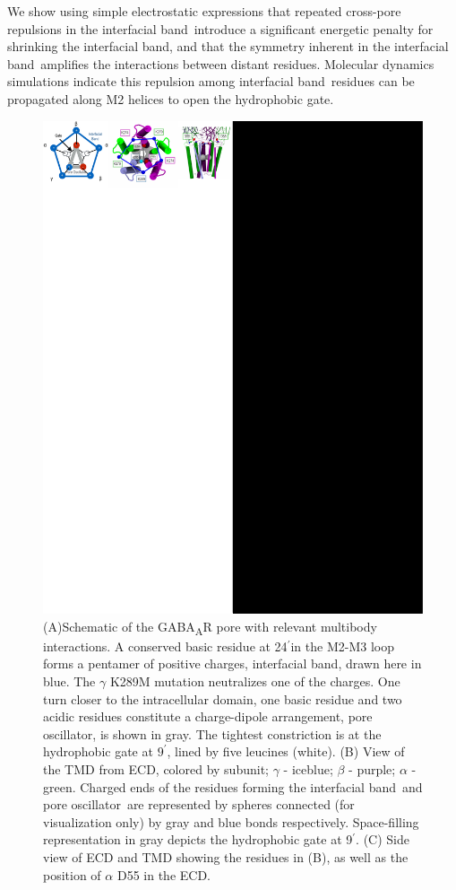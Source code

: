 \documentclass[journal=jacsat,manuscript=article]{achemso}
\newcommand{\GABAA}{GABA\textsubscript{A}R\xspace}
\newcommand{\fivering}{interfacial band~}
\newcommand{\fiveringnos}{interfacial band}
\newcommand{\triad}{pore oscillator~}
\newcommand{\triadns}{pore oscillator}
\begin{document}
We show using simple electrostatic expressions that repeated cross-pore repulsions in the \fivering introduce a significant energetic penalty for shrinking the \fiveringnos,  and that the symmetry inherent in the \fivering amplifies the interactions between distant residues.  Molecular dynamics simulations indicate this repulsion among \fivering residues can be  propagated along M2 helices to open the hydrophobic gate.   
\begin{figure}[t]
\centering
\includegraphics[width = .5\textwidth]{figures_2/Pillar_1_fig.pdf}
\caption{(A)Schematic of the \GABAA pore with relevant multibody interactions.   A conserved basic residue at 24$^{\prime}$in the M2-M3 loop forms a pentamer of positive charges, \fiveringnos, drawn here in blue. %
The $\gamma$ K289M mutation neutralizes one of the charges. One turn closer to the intracellular domain,  one basic residue and two acidic residues constitute a charge-dipole arrangement, \triadns, is shown in gray.  The tightest constriction is at the hydrophobic gate at $9^{\prime}$, lined by five leucines (white).   (B) View of the TMD from ECD,  colored by subunit; $\gamma$ - iceblue; $\beta$ - purple; $\alpha$ - green. Charged ends of the residues forming the \fivering and \triad are represented by spheres connected (for visualization only) by gray and blue bonds respectively. Space-filling representation in gray depicts the hydrophobic gate at 9$^{\prime}$. (C) Side view of ECD and TMD showing the residues in (B), as well as the position of $\alpha$ D55 in the ECD.
\label{fig:fig1}
}
\end{figure}
\end{document}

